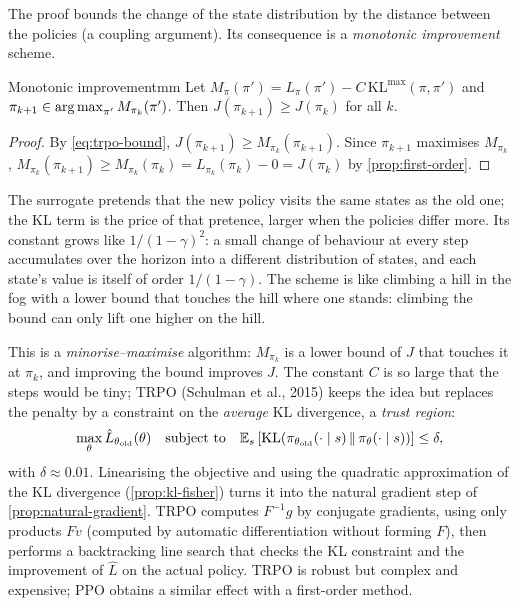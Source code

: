 The proof bounds the change of the state distribution by the distance
between the policies (a coupling argument). Its consequence is a
\emph{monotonic improvement} scheme.

\begin{corollary}{Monotonic improvement}{mm}
  Let $M_\pi(\pi') = L_\pi(\pi') - C\, \mathrm{KL}^{\max}(\pi, \pi')$ and
  $\pi_{k+1} \in \operatorname*{arg\,max}_{\pi'} M_{\pi_k}(\pi')$. Then $J(\pi_{k+1}) \geq
  J(\pi_k)$ for all $k$.
\end{corollary}

\begin{proof}
  By \eqref{eq:trpo-bound}, $J(\pi_{k+1}) \geq M_{\pi_k}(\pi_{k+1})$. Since
  $\pi_{k+1}$ maximises $M_{\pi_k}$, $M_{\pi_k}(\pi_{k+1}) \geq
  M_{\pi_k}(\pi_k) = L_{\pi_k}(\pi_k) - 0 = J(\pi_k)$ by
  \cref{prop:first-order}.
\end{proof}

\begin{intuition}
  The surrogate pretends that the new policy visits the same states as the
  old one; the KL term is the price of that pretence, larger when the
  policies differ more. Its constant grows like $1 / (1 - \gamma)^2$: a small
  change of behaviour at every step accumulates over the horizon into a
  different distribution of states, and each state's value is itself of
  order $1 / (1 - \gamma)$. The scheme is like climbing a hill in the fog
  with a lower bound that touches the hill where one stands: climbing the
  bound can only lift one higher on the hill.
\end{intuition}

This is a \emph{minorise--maximise} algorithm: $M_{\pi_k}$ is a lower bound
of $J$ that touches it at $\pi_k$, and improving the bound improves $J$. The
constant $C$ is so large that the steps would be tiny; TRPO (Schulman et
al., 2015) keeps the idea but replaces the penalty by a constraint on the
\emph{average} KL divergence, a \emph{trust region}:
\begin{equation}
  \max_{\theta} \hat L_{\theta_{\mathrm{old}}}(\theta) \quad \text{subject
  to} \quad \mathbb{E}_{s}\left[\mathrm{KL}(\pi_{\theta_{\mathrm{old}}}(\cdot \mid
  s) \,\|\, \pi_\theta(\cdot \mid s))\right] \leq \delta,
\end{equation}
with $\delta \approx 0.01$. Linearising the objective and using the
quadratic approximation of the KL divergence (\cref{prop:kl-fisher}) turns
it into the natural gradient step of \cref{prop:natural-gradient}. TRPO
computes $F^{-1} g$ by conjugate gradients, using only products $F v$
(computed by automatic differentiation without forming $F$), then performs
a backtracking line search that checks the KL constraint and the
improvement of $\hat L$ on the actual policy. TRPO is robust but complex
and expensive; PPO obtains a similar effect with a first-order method.

